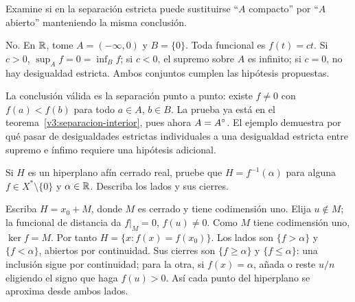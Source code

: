 \begin{ejercicio}\label{ej:v3-l05-5}
Examine si en la separación estricta puede sustituirse ``$A$ compacto'' por ``$A$ abierto'' manteniendo la misma conclusión.
\end{ejercicio}
\begin{solucion}
No. En $\mathbb R$, tome $A=(-\infty,0)$ y $B=\{0\}$. Toda funcional es $f(t)=ct$. Si $c>0$, $\sup_Af=0=\inf_Bf$; si $c<0$, el supremo sobre $A$ es infinito; si $c=0$, no hay desigualdad estricta. Ambos conjuntos cumplen las hipótesis propuestas.

La conclusión válida es la separación punto a punto: existe $f\ne0$ con $f(a)<f(b)$ para todo $a\in A$, $b\in B$. La prueba ya está en el teorema~\ref{v3:separacion-interior}, pues ahora $A=A^{\circ}$. El ejemplo demuestra por qué pasar de desigualdades estrictas individuales a una desigualdad estricta entre supremo e ínfimo requiere una hipótesis adicional.
\end{solucion}

\begin{ejercicio}\label{ej:v3-l05-6}
Si $H$ es un hiperplano afín cerrado real, pruebe que $H=f^{-1}(\alpha)$ para alguna $f\in X^*\setminus\{0\}$ y $\alpha\in\mathbb R$. Describa los lados y sus cierres.
\end{ejercicio}
\begin{solucion}
Escriba $H=x_0+M$, donde $M$ es cerrado y tiene codimensión uno. Elija $u\notin M$; la funcional de distancia da $f|_M=0$, $f(u)\ne0$. Como $M$ tiene codimensión uno, $\ker f=M$. Por tanto $H=\{x:f(x)=f(x_0)\}$. Los lados son $\{f>\alpha\}$ y $\{f<\alpha\}$, abiertos por continuidad. Sus cierres son $\{f\geq\alpha\}$ y $\{f\leq\alpha\}$: una inclusión sigue por continuidad; para la otra, si $f(x)=\alpha$, añada o reste $u/n$ eligiendo el signo que haga $f(u)>0$. Así cada punto del hiperplano se aproxima desde ambos lados.
\end{solucion}

